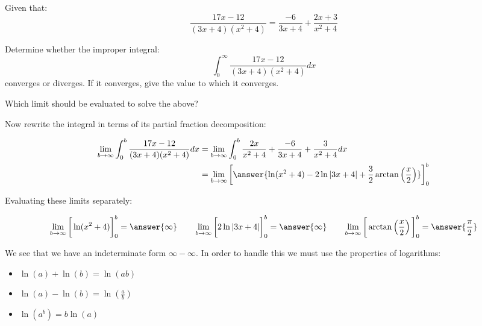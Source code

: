 \documentclass{ximera}
\author{Jim Talamo}
\begin{document}
\begin{exercise}
Given that: 
\[ \dfrac{17x-12}{(3x+4)(x^2+4)} = \dfrac{-6}{3x+4} + \dfrac{2x+3}{x^2+4} \]

Determine whether the improper integral:
\[ \displaystyle \int_0^{\infty} \dfrac{17x-12}{(3x+4)(x^2+4)} dx \]
 converges or diverges.  If it converges, give the value to which it converges.  

Which limit should be evaluated to solve the above?

\begin{multipleChoice}
\end{multipleChoice}

\begin{exercise}

Now rewrite the integral in terms of its partial fraction decomposition:

\begin{align*}
\lim_{b\rightarrow \infty} \int_{0}^{b}
\frac{17x-12}{(3x+4)(x^2+4)} dx&=
\lim_{b\rightarrow \infty} \int_{0}^{b}
 \frac{2x}{x^2+4}+
\frac{-6}{3x+4}+
\frac{3}{x^2+4}  dx \\
&= \lim_{b\rightarrow \infty} \bigg[\answer{\ln(x^2+4)-2 \ln|3x+4|+\frac{3}{2} \arctan\left(\frac{x}{2}\right)}\bigg]_0^b
\end{align*}




\begin{exercise}

Evaluating these limits separately:

\[ \lim_{b\rightarrow \infty} \bigg[\ln(x^2+4)\bigg]_0^b = \answer{\infty}  \qquad   \lim_{b\rightarrow \infty} \bigg[2 \ln|3x+4|\bigg]_0^b = \answer{\infty}   \qquad    \lim_{b\rightarrow \infty} \bigg[\arctan\left(\frac{x}{2}\right)\bigg]_0^b = \answer{\frac{\pi}{2}} \]

\begin{exercise}
We see that we have an indeterminate form $\infty - \infty$.  In order to handle this we must use the properties of logarithms:

\begin{itemize}
\item $\ln(a)+\ln(b) = \ln(ab)$
\item $\ln(a)-\ln(b) = \ln\left(\frac{a}{b}\right)$
\item $\ln\left(a^b\right) = b \ln(a)$
\end{itemize}


\end{exercise}
\end{exercise}
\end{exercise}
\end{exercise}
\end{document}
